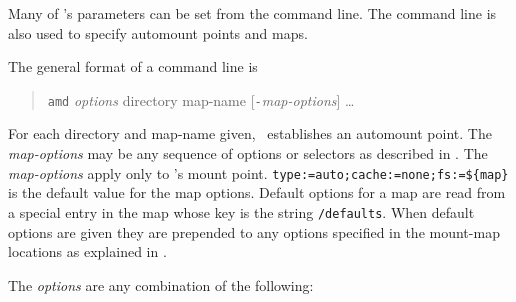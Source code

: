 %
%
%
%


Many of \amd's parameters can be set from the command line.
The command line is also used to specify automount points
and maps.

The general format of a command line is
\begin{quote}
{\tt amd} {\em options} directory map-name [{\tt -}{\em map-options}] \ldots
\end{quote}
For each directory and map-name given, \amd\ establishes an automount point.
The {\em map-options} may be any sequence of options or selectors as described
in .
The {\em map-options} apply only to \amd's mount point.
{\tt type:=auto;cache:=none;fs:=\$\{map\}} is the default value for the map options.
Default options for
a map are read from a special entry in the map whose key is the string
{\tt /defaults}.
When default options are given they are prepended to any
options specified in the mount-map locations as explained in .

The {\em options} are any combination of the following:

